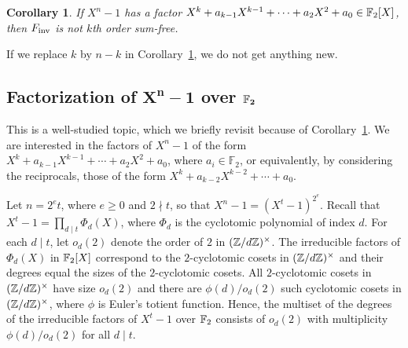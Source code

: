 \documentclass{amsart}
\newtheorem{cor}[thm]{Corollary}
\numberwithin{equation}{section}
\theoremstyle{definition}
\newcommand{\f}{\Bbb F}
\newcommand{\fin}{F_{\text{\rm inv}}}
\begin{document}
\begin{cor}\label{C2.2}
If $X^n-1$ has a factor $X^k+a_{k-1}X^{k-1}+\cdots+a_2X^2+a_0\in\f_2[X]$, then $\fin$ is not $k$th order sum-free.
\end{cor}

\medskip
{} If we replace $k$ by $n-k$ in Corollary~\ref{C2.2}, we do not get anything new.


\subsection{Factorization of $\boldsymbol{X^n-1}$ over $\boldsymbol{\f_2}$}

This is a well-studied topic, which we briefly revisit because of Corollary~\ref{C2.2}. We are interested in the factors of $X^n-1$ of the form $X^k+a_{k-1}X^{k-1}+\cdots+a_2X^2+a_0$, where $a_i\in \mathbb F_2$, or equivalently, by considering the reciprocals, those of the form $X^k+a_{k-2}X^{k-2}+\cdots+a_0$. 

Let $n=2^et$, where $e\ge 0$ and $2\nmid t$, so that $X^n-1=(X^t-1)^{2^e}$. 
Recall that $X^t-1=\prod_{d\mid t}\Phi_d(X)$, where $\Phi_d$ is the cyclotomic polynomial of index $d$. For each $d\mid t$, let $o_d(2)$ denote the order of $2$ in $(\Bbb Z/d\Bbb Z)^\times$. The irreducible factors of $\Phi_d(X)$ in $\f_2[X]$ correspond to the $2$-cyclotomic cosets in $(\Bbb Z/d\Bbb Z)^\times$ and their degrees equal the sizes of the 
$2$-cyclotomic cosets. All $2$-cyclotomic cosets in $(\Bbb Z/d\Bbb Z)^\times$ have size $o_d(2)$ and there are $\phi(d)/o_d(2)$ such cyclotomic cosets in $(\Bbb Z/d\Bbb Z)^\times$, where $\phi$ is Euler's totient function. Hence, the multiset of the degrees of the irreducible factors of $X^t-1$ over $\f_2$ consists of $o_d(2)$ with multiplicity $\phi(d)/o_d(2)$ for all $d\mid t$. 
\end{document}

